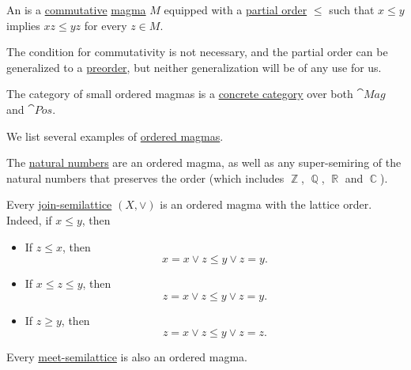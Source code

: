 \begin{definition}\label{def:ordered_magma}\mimprovised
  An  is a \hyperref[def:magma/commutative]{commutative} \hyperref[def:magma]{magma} \( M \) equipped with a \hyperref[def:partially_ordered_set]{partial order} \( \leq \) such that \( x \leq y \) implies \( xz \leq yz \) for every \( z \in M \).

  The condition for commutativity is not necessary, and the partial order can be generalized to a \hyperref[def:preordered_set]{preorder}, but neither generalization will be of any use for us.

  The category of small ordered magmas is a \hyperref[def:concrete_category]{concrete category} over both \hyperref[def:magma/category]{\( \cat{Mag} \)} and \hyperref[def:partially_ordered_set/category]{\( \cat{Pos} \)}.
\end{definition}

\begin{example}\label{ex:def:ordered_magma}
  We list several examples of \hyperref[def:ordered_magma]{ordered magmas}.

  \begin{thmenum}
     The \hyperref[def:set_of_natural_numbers]{natural numbers} are an ordered magma, as well as any super-semiring of the natural numbers that preserves the order (which includes \( \BbbZ \), \( \BbbQ \), \( \BbbR \) and \( \BbbC \)).

     Every \hyperref[def:semilattice/join]{join-semilattice} \( (X, \vee) \) is an ordered magma with the lattice order. Indeed, if \( x \leq y \), then
    \begin{itemize}
      \item If \( z \leq x \), then
      \begin{equation*}
        x = x \vee z \leq y \vee z = y.
      \end{equation*}

      \item If \( x \leq z \leq y \), then
      \begin{equation*}
        z = x \vee z \leq y \vee z = y.
      \end{equation*}

      \item If \( z \geq y \), then
      \begin{equation*}
        z = x \vee z \leq y \vee z = z.
      \end{equation*}
    \end{itemize}

    Every \hyperref[def:semilattice/meet]{meet-semilattice} is also an ordered magma.
  \end{thmenum}
\end{example}

